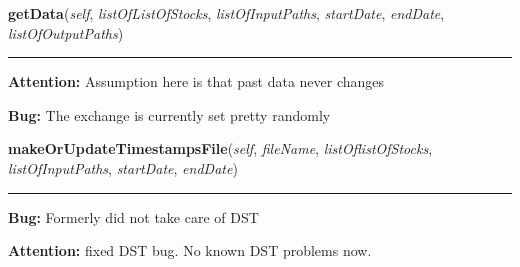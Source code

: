     \label{QSTK:csvconverter:csvapi:StockPriceData:getData}

    \vspace{0.5ex}

\hspace{.8\funcindent}\begin{boxedminipage}{\funcwidth}

    \raggedright \textbf{getData}(\textit{self}, \textit{listOfListOfStocks}, \textit{listOfInputPaths}, \textit{startDate}, \textit{endDate}, \textit{listOfOutputPaths})

    \vspace{-1.5ex}

    \rule{\textwidth}{0.5\fboxrule}
\setlength{\parskip}{2ex}
\setlength{\parskip}{1ex}
\textbf{Attention:} Assumption here is that past data never changes



\textbf{Bug:} The exchange is currently set pretty randomly



    \end{boxedminipage}

    \label{QSTK:csvconverter:csvapi:StockPriceData:makeOrUpdateTimestampsFile}

    \vspace{0.5ex}

\hspace{.8\funcindent}\begin{boxedminipage}{\funcwidth}

    \raggedright \textbf{makeOrUpdateTimestampsFile}(\textit{self}, \textit{fileName}, \textit{listOflistOfStocks}, \textit{listOfInputPaths}, \textit{startDate}, \textit{endDate})

    \vspace{-1.5ex}

    \rule{\textwidth}{0.5\fboxrule}
\setlength{\parskip}{2ex}
\setlength{\parskip}{1ex}
\textbf{Bug:} Formerly did not take care of DST



\textbf{Attention:} fixed DST bug. No known DST problems now.



    \end{boxedminipage}

